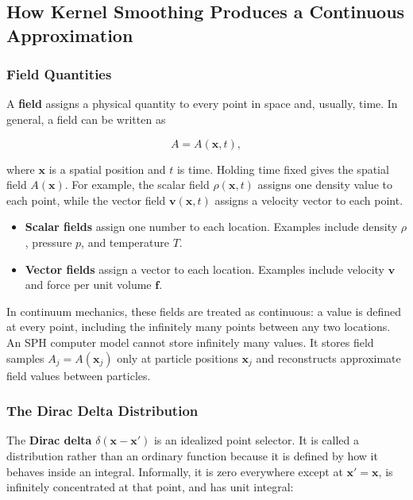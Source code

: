 \documentclass[11pt]{article}
\begin{document}
\subsection{How Kernel Smoothing Produces a Continuous Approximation}

\subsubsection{Field Quantities}

A \textbf{field} assigns a physical quantity to every point in space and,
usually, time. In general, a field can be written as

\begin{equation}
    A = A(\mathbf{x},t),
\end{equation}

where $\mathbf{x}$ is a spatial position and $t$ is time. Holding time fixed
gives the spatial field $A(\mathbf{x})$. For example, the scalar field
$\rho(\mathbf{x},t)$ assigns one density value to each point, while the vector
field $\mathbf{v}(\mathbf{x},t)$ assigns a velocity vector to each point.

\begin{itemize}
    \item \textbf{Scalar fields} assign one number to each location. Examples
    include density $\rho$, pressure $p$, and temperature $T$.
    \item \textbf{Vector fields} assign a vector to each location. Examples
    include velocity $\mathbf{v}$ and force per unit volume $\mathbf{f}$.
\end{itemize}

In continuum mechanics, these fields are treated as continuous: a value is
defined at every point, including the infinitely many points between any two
locations. An SPH computer model cannot store infinitely many values. It stores
field samples $A_j = A(\mathbf{x}_j)$ only at particle positions
$\mathbf{x}_j$ and reconstructs approximate field values between particles.

\subsubsection{The Dirac Delta Distribution}

The \textbf{Dirac delta} $\delta(\mathbf{x}-\mathbf{x}')$ is an idealized point
selector. It is called a distribution rather than an ordinary function because
it is defined by how it behaves inside an integral. Informally, it is zero
everywhere except at $\mathbf{x}'=\mathbf{x}$, is infinitely concentrated at
that point, and has unit integral:
\end{document}
